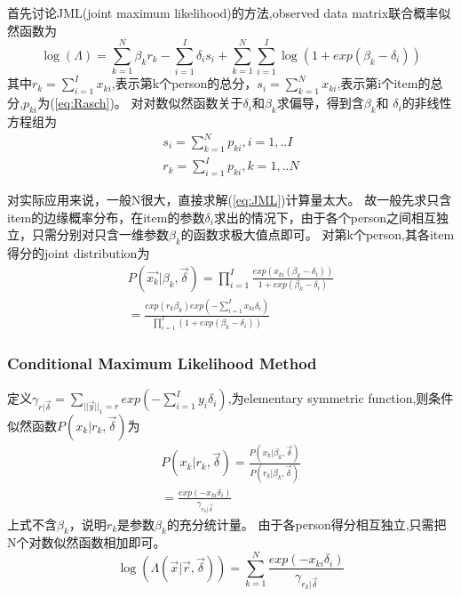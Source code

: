 \documentclass[xetex,mathserif,serif]{beamer}
\begin{document}
  \begin{frame}
    
     首先讨论JML(joint maximum likelihood)的方法,observed data matrix联合概率似然函数为
\pause\begin{equation}
\log(\Lambda)=\sum_{k=1}^N \beta_k r_k -\sum_{i=1}^I \delta_i s_i+
\sum_{k=1}^N \sum_{i=1}^I \log(1+exp(\beta_k-\delta_i))
\end{equation}
其中$r_k=\displaystyle\sum_{i=1}^I x_{ki}$,表示第k个person的总分，$s_i=\displaystyle\sum_{k=1}^N x_{ki}$,表示第i个item的总分,$p_{ki}$为(\ref{eq:Rasch})。
对对数似然函数关于$\delta_i$和$\beta_k$求偏导，得到含$\beta_k$和
$\delta_i$的非线性方程组为
\pause\begin{equation}
\begin{split}\label{eq:JML}
s_i=\sum_{k=1}^N p_{ki},i=1,..I\\
r_k=\sum_{i=1}^I p_{ki},k=1,..N
\end{split}
\end{equation}

  \end{frame}
  \begin{frame}
    
    对实际应用来说，一般N很大，直接求解(\ref{eq:JML})计算量太大。
故一般先求只含item的边缘概率分布，在item的参数$\delta_i$求出的情况下，由于各个person之间相互独立，只需分别对只含一维参数$\beta_k$的函数求极大值点即可。
对第k个person,其各item得分的joint distribution为
\pause\begin{equation}
\begin{split}
P(\vec{x_k}|\beta_k,\vec{\delta})=\prod_{i=1}^I \frac{exp(x_{ki}(\beta_k-\delta_i))}{1+exp(\beta_k-\delta_i)}\\
=\frac{exp(r_k\beta_k)exp(-\sum_{i=1}^I x_{ki}\delta_i)}{\prod_{i=1}^I (1+exp(\beta_k-\delta_i))}
\end{split}
\end{equation}

  \end{frame}
  \begin{frame}
    
    \frametitle{Conditional Maximum Likelihood Method}
    定义$\gamma_{r|\vec{\delta}}=\displaystyle\sum_{||\vec{y}||_1=r}exp(-\sum_{i=1}^I y_{i}\delta_i)$,为elementary symmetric function,则条件似然函数$P(x_k|r_k,\vec{\delta})$为
\pause\begin{equation}
\begin{split}
P(x_k|r_k,\vec{\delta})=\frac{P(x_k|\beta_k,\vec{\delta})}{P(r_k|\beta_k,\vec{\delta})}\\
=\frac{exp(-x_{ki}\delta_i)}{\gamma_{r_k|\vec{\delta}}}
\end{split}
\end{equation}
上式不含$\beta_k$，说明$r_k$是参数$\beta_k$的充分统计量。
由于各person得分相互独立,只需把N个对数似然函数相加即可。
\pause\begin{equation}
\log(\Lambda(\vec{x}|\vec{r},\vec{\delta}))=\sum_{k=1}^N \frac{exp(-x_{ki}\delta_i)}{\gamma_{r_k|\vec{\delta}}}
\end{equation}

  \end{frame}
\end{document}
